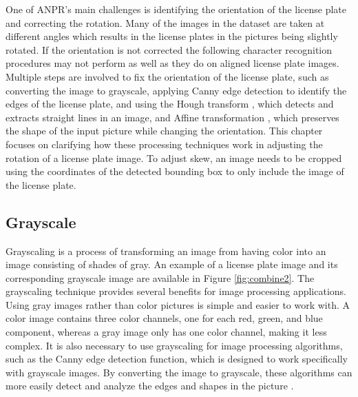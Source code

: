 \documentclass[conference]{IEEEtran}
\begin{document}
One of ANPR's main challenges is identifying the orientation of the license plate and correcting the rotation. Many of the images in the dataset are taken at different angles which results in the license plates in the pictures being slightly rotated. If the orientation is not corrected the following character recognition procedures may not perform as well as they do on aligned license plate images. Multiple steps are involved to fix the orientation of the license plate, such as converting the image to grayscale, applying Canny edge detection \cite{b14} to identify the edges of the license plate, and using the Hough transform \cite{b15}, which detects and extracts straight lines in an image, and Affine transformation \cite{b17}, which preserves the shape of the input picture while changing the orientation. This chapter focuses on clarifying how these processing techniques work in adjusting the rotation of a license plate image. To adjust skew, an image needs to be cropped using the coordinates of the detected bounding box to only include the image of the license plate. 

\subsection{Grayscale}

Grayscaling is a process of transforming an image from having color into an image consisting of shades of gray. An example of a license plate image and its corresponding grayscale image are available in Figure \ref{fig:combine2}.  The grayscaling technique provides several benefits for image processing applications. Using gray images rather than color pictures is simple and easier to work with. A color image contains three color channels, one for each red, green, and blue component, whereas a gray image only has one color channel, making it less complex. It is also necessary to use grayscaling for image processing algorithms, such as the Canny edge detection function, which is designed to work specifically with grayscale images. By converting the image to grayscale, these algorithms can more easily detect and analyze the edges and shapes in the picture \cite{b11}. 
\end{document}
